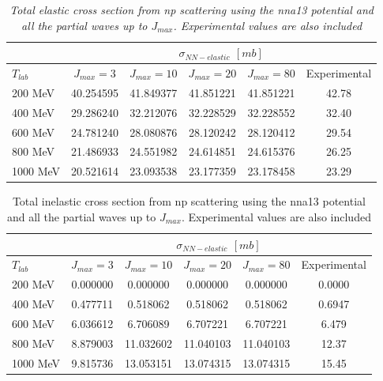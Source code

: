 \begin{table}[!hbp]
\begin{tabular}{|l|c|c|c|c|c|}
\hline
& \multicolumn{5}{|c|}{$\sigma_{NN-elastic}$ $[mb]$}\\
\hline
$T_{lab}$& { $J_{max}=3$}  & { $J_{max}=10$} & { $J_{max}=20$} & $J_{max}=80$ & Experimental\\
\hline
200 MeV&40.254595&41.849377 &41.851221  &41.851221 &42.78\\
\hline
400 MeV&29.286240&32.212076 &32.228529  &32.228552 &32.40\\
\hline
600 MeV&24.781240&28.080876 &28.120242  &28.120412 &29.54\\
\hline
800 MeV&21.486933&24.551982 &24.614851  &24.615376 &26.25\\
\hline
1000 MeV&20.521614&23.093538 &23.177359 & 23.178458 &23.29\\ 
\hline
\end{tabular}
\caption{
\label{tabcrossel}
\sl Total elastic cross section from np scattering using the nna13 potential and all the partial waves up to $J_{max}$. 
Experimental values \cite{PRC62faseskift3GeV}  are also included}
\end{table}
%
%
\begin{table}[!hbp]
\begin{tabular}{|l|c|c|c|c|c|}
\hline
& \multicolumn{5}{|c|}{$\sigma_{NN-elastic}$ $[mb]$}\\
\hline
$T_{lab}$& $J_{max}=3$  & $J_{max}=10$  & $J_{max}=20$ & $J_{max}=80$ & Experimental\\
\hline
200 MeV&0.000000&0.000000 &0.000000  &0.000000 &0.0000\\
\hline
400 MeV&0.477711&0.518062 &0.518062  &0.518062 &0.6947\\
\hline
600 MeV&6.036612&6.706089 &6.707221  &6.707221 &6.479\\
\hline
800 MeV&8.879003&11.032602 &11.040103  &11.040103 &12.37\\
\hline
1000 MeV&9.815736&13.053151&13.074315  &13.074315 &15.45\\
\hline
\end{tabular}
\caption{
\label{tabcrossinel}
Total inelastic cross section from np scattering using the nna13 potential and all the partial waves up to $J_{max}$.
Experimental values \cite{PRC62faseskift3GeV}  are also included}
\end{table}


